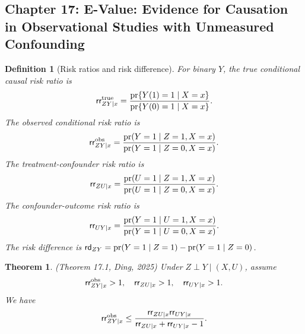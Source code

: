 \documentclass[krantz1]{krantz}
\newtheorem{definition}{Definition}
\newtheorem{thesis}{Theorem}[chapter]
\def\pr{\textup{pr}}
\def\ind{\perp}
\def\RD{\textsf{rd}}
\def\RR{\textsf{rr}}
\def\true{\textup{true}}
\def\obs{\textup{obs}}
\begin{document}
\subsection{Chapter 17: E-Value: Evidence for Causation in Observational Studies with Unmeasured Confounding}

\begin{definition}[Risk ratios and risk difference]\label{17:def:RR-RD}
For binary $Y$, the true conditional causal risk ratio is
$$\RR_{ZY\mid x}^\true = \frac{\pr\{Y(1)=1\mid X=x\}}{\pr\{Y(0)=1\mid X=x\}}.$$
The observed conditional risk ratio is
$$\RR_{ZY\mid x}^\obs = \frac{\pr(Y=1\mid Z=1,X=x)}{\pr(Y=1\mid Z=0,X=x)}.$$
The treatment-confounder risk ratio is
$$\RR_{ZU\mid x} = \frac{\pr(U=1\mid Z=1,X=x)}{\pr(U=1\mid Z=0,X=x)}.$$
The confounder-outcome risk ratio is
$$\RR_{UY\mid x} = \frac{\pr(Y=1\mid U=1,X=x)}{\pr(Y=1\mid U=0,X=x)}.$$
The risk difference is $\RD_{ZY} = \pr(Y=1\mid Z=1) - \pr(Y=1\mid Z=0)$.
\end{definition}

\begin{thesis}\label{17.1}\emph{(Theorem 17.1, Ding, 2025)}
Under $Z\ind Y\mid (X, U)$, assume
\begin{equation}\label{eq::evalue-17.1}
\RR_{ZY\mid x}^\obs > 1, \quad \RR_{ZU\mid x} > 1,\quad \RR_{UY\mid x} > 1.
\end{equation}
We have
$$
\RR_{ZY\mid x}^\obs \leq \frac{ \RR_{ZU\mid x}  \RR_{UY\mid x} }{  \RR_{ZU\mid x} + \RR_{UY\mid x} - 1} .
$$
\end{thesis}
\end{document}

